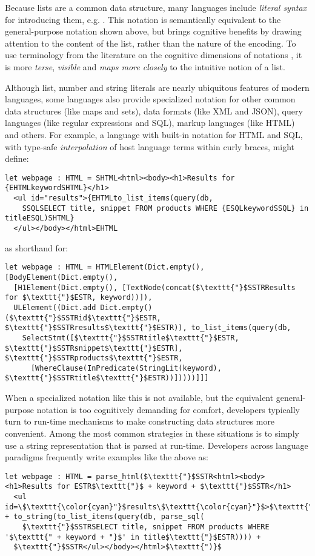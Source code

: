 Because lists are a common data structure, many languages include \emph{literal syntax} for introducing them, e.g. \li{[1, 2, 3, 4]}. This notation is semantically equivalent to the general-purpose notation shown above, but brings cognitive benefits by drawing attention to the content of the list, rather than the nature of the encoding. To use terminology from the literature on the cognitive dimensions of notations \cite{green1996usability}, it is more \emph{terse}, \emph{visible} and \emph{maps more closely} to the intuitive notion of a list.

Although list, number and string literals are nearly ubiquitous features of modern languages, some languages also  provide specialized notation for other common data structures (like maps and sets), data formats (like XML and JSON), query languages (like regular expressions and SQL), markup languages (like HTML) and others. For example, a language with built-in notation for HTML and SQL, with type-safe \emph{interpolation} of host language terms within curly braces, might define:
\begin{lstlisting}
let webpage : HTML = SHTML<html><body><h1>Results for {EHTMLkeywordSHTML}</h1>
  <ul id="results">{EHTMLto_list_items(query(db, 
    SSQLSELECT title, snippet FROM products WHERE {ESQLkeywordSSQL} in titleESQL)SHTML}
  </ul></body></html>EHTML
\end{lstlisting}
as shorthand for:
\begin{lstlisting}
let webpage : HTML = HTMLElement(Dict.empty(), [BodyElement(Dict.empty(),
  [H1Element(Dict.empty(), [TextNode(concat($\texttt{"}$SSTRResults for $\texttt{"}$ESTR, keyword))]), 
  ULElement((Dict.add Dict.empty() ($\texttt{"}$SSTRid$\texttt{"}$ESTR, $\texttt{"}$SSTRresults$\texttt{"}$ESTR)), to_list_items(query(db, 
    SelectStmt([$\texttt{"}$SSTRtitle$\texttt{"}$ESTR, $\texttt{"}$SSTRsnippet$\texttt{"}$ESTR], $\texttt{"}$SSTRproducts$\texttt{"}$ESTR, 
      [WhereClause(InPredicate(StringLit(keyword), $\texttt{"}$SSTRtitle$\texttt{"}$ESTR))]))))]]]
\end{lstlisting}

When a specialized notation like this is not available, but the equivalent general-purpose notation is too cognitively demanding for comfort, developers typically turn to run-time mechanisms to make constructing data structures more convenient. Among the most common strategies in these situations is to simply use a string representation that is parsed at run-time. Developers across language paradigms frequently write examples like the above as:
\begin{lstlisting}
let webpage : HTML = parse_html($\texttt{"}$SSTR<html><body><h1>Results for ESTR$\texttt{"}$ + keyword + $\texttt{"}$SSTR</h1>
  <ul id=\$\texttt{\color{cyan}"}$results\$\texttt{\color{cyan}"}$>$\texttt{"}$ESTR + to_string(to_list_items(query(db, parse_sql(
  	$\texttt{"}$SSTRSELECT title, snippet FROM products WHERE '$\texttt{" + keyword + "}$' in title$\texttt{"}$ESTR)))) + 
  $\texttt{"}$SSTR</ul></body></html>$\texttt{")}$
\end{lstlisting}

